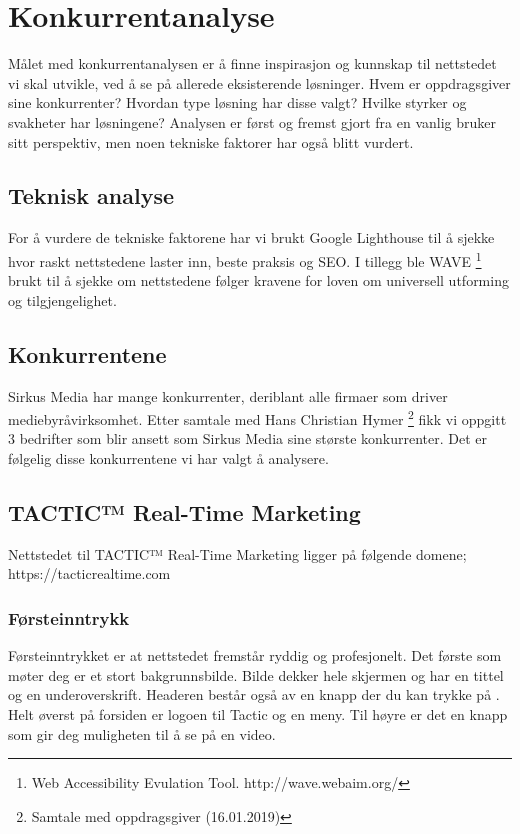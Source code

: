 \clearpage

\section{Konkurrentanalyse}

Målet med konkurrentanalysen er å finne inspirasjon og kunnskap til nettstedet vi skal utvikle, ved å se på allerede eksisterende løsninger. Hvem er oppdragsgiver sine konkurrenter? Hvordan type løsning har disse valgt? Hvilke styrker og svakheter har løsningene? Analysen er først og fremst gjort fra en vanlig bruker sitt perspektiv, men noen tekniske faktorer har også blitt vurdert.

\subsection{Teknisk analyse}
For å vurdere de tekniske faktorene har vi brukt Google Lighthouse til å sjekke hvor raskt nettstedene laster inn, beste praksis og SEO. I tillegg ble WAVE \footnote{Web Accessibility Evulation Tool. http://wave.webaim.org/} brukt til å sjekke om nettstedene følger kravene for loven om universell utforming og tilgjengelighet.

\subsection{Konkurrentene}
Sirkus Media har mange konkurrenter, deriblant alle firmaer som driver mediebyråvirksomhet. Etter samtale med Hans Christian Hymer \footnote{Samtale med oppdragsgiver (16.01.2019)} fikk vi oppgitt 3 bedrifter som blir ansett som Sirkus Media sine største konkurrenter. Det er følgelig disse konkurrentene vi har valgt å analysere.

\subsection{TACTIC™ Real-Time Marketing}
Nettstedet til TACTIC™ Real-Time Marketing ligger på følgende domene; https://tacticrealtime.com

\subsubsection{Førsteinntrykk}
Førsteinntrykket er at nettstedet fremstår ryddig og profesjonelt. Det første som møter deg er et stort bakgrunnsbilde. Bilde dekker hele skjermen og har en tittel og en underoverskrift. Headeren består også av en knapp der du kan trykke på . Helt øverst på forsiden er logoen til Tactic og en meny. Til høyre er det en knapp som gir deg muligheten til å se på en video. 


